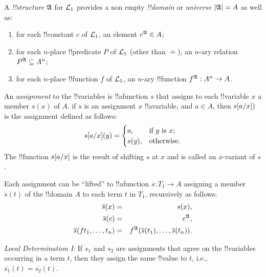 \documentclass[../../include/open-logic-section]{subfiles}
\begin{document}


\begin{defn}[Structure]
  A \emph{!!{structure}} $\mathfrak A$ for $\mathcal L_1$ provides a non
  empty \emph{!!{domain}} or \emph{universe} $\left| \mathfrak A \right| = A$ as well
  as:
  \begin{enumerate}
  \item for each !!{constant} $c$ of $\mathcal L_1$, an element
    $c^\mathfrak A \in A$;
  \item for each $n$-place !!{predicate} $P$ of $\mathcal L_1$
    (other than $\doteq$), an
    $n$-ary relation $P^\mathfrak A \subseteq A^n$;
  \item for each $n$-place !!{function} $f$ of $\mathcal L_1$, an
    $n$-ary !!{function} $f^\mathfrak A :  A^n \to A$.
  \end{enumerate}
\end{defn} 

\begin{defn}
An \emph{assignment} to the !!{variable}s is !!a{function} $s$ that assigns
to each !!{variable} $x$ a member $s(x)$ of $A$. if $s$ is an assignment
$x$ !!a{variable}, and $a \in A$, then $s[a/x])$ is the assignment
defined as follows:
  \[
  \Subst{s}{a}{x}(y) = 
  \begin{cases}
    a, & \mbox{if $y$ is $x$;}\\
    s(y), & \mbox{otherwise}.
  \end{cases}
  \]
The !!{function} $s[a/x]$ is the result of shifting $s$ at $x$ and
is called an $x$-variant of $s$.
\end{defn}

\begin{prop}
Each assignment can be ``lifted'' to !!a{function} $\overline s : T_1 \to
A$
assigning a member $\overline s(t)$ of the !!{domain} $A$ to each term $t$
in
  $T_1$, recursively as follows:
  \begin{eqnarray*}
    \overline s(x) &=& s(x), \\
    \overline s(c) &=& c^\Struct{A}, \\
\overline s(ft_1,\ldots,t_n) &=& f^\Struct{A}(\overline
s(t_1),\ldots,\overline s(t_n)).
  \end{eqnarray*}
\end{prop}

\begin{thm} 
\emph{Local Determination I}: If $s_1$ and $s_2$ are
assignments that agree on the !!{variable}s occurring in a term $t$, then
they assign the same !!{value} to $t$, i.e., $\overline{s_1}(t) =
  \overline{s_2}(t)$. 
\end{thm}
\end{document}
